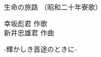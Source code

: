 \documentclass[10pt,b5j]{tarticle} %
\begin{document}
\begin{minipage}[c]{0.7\hsize} %
    \begin{center}
        {\LARGE
            生命の旅路 %
        }
        {\small 
            （昭和二十年寮歌） %
        }
    \end{center}
\end{minipage}
\begin{minipage}[c]{0.3\hsize} %
    \begin{flushright} %
        幸坂彪君 作歌\\新井忠雄君 作曲 %
    \end{flushright}
\end{minipage}
\begin{minipage}[c]{0.7\hsize} %
    \begin{center}
        {\large 
            ‐輝かしき首途のときに‐
        }
    \end{center}
\end{minipage}
\end{document}
